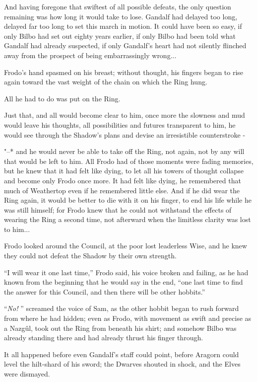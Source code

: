 And having foregone that swiftest of all possible defeats, the only
question remaining was how long it would take to lose. Gandalf had
delayed too long, delayed far too long to set this march in motion. It
could have been so easy, if only Bilbo had set out eighty years earlier,
if only Bilbo had been told what Gandalf had already suspected, if only
Gandalf's heart had not silently flinched away from the prospect of
being embarrassingly wrong...

Frodo's hand spasmed on his breast; without thought, his fingers began
to rise again toward the vast weight of the chain on which the Ring
hung.

All he had to do was put on the Ring.

Just that, and all would become clear to him, once more the slowness and
mud would leave his thoughts, all possibilities and futures transparent
to him, he would see through the Shadow's plans and devise an
irresistible counterstroke -

"--* and he would never be able to take off the Ring, not again, not by any
will that would be left to him. All Frodo had of those moments were
fading memories, but he knew that it had felt like dying, to let all his
towers of thought collapse and become only Frodo once more. It had felt
like dying, he remembered that much of Weathertop even if he remembered
little else. And if he did wear the Ring again, it would be better to
die with it on his finger, to end his life while he was still himself;
for Frodo knew that he could not withstand the effects of wearing the
Ring a second time, not afterward when the limitless clarity was lost to
him...

Frodo looked around the Council, at the poor lost leaderless Wise, and
he knew they could not defeat the Shadow by their own strength.

``I will wear it one last time,'' Frodo said, his voice broken and
failing, as he had known from the beginning that he would say in the
end, ``one last time to find the answer for this Council, and then there
will be other hobbits.''

``\emph{No!} '' screamed the voice of Sam, as the other hobbit began to
rush forward from where he had hidden; even as Frodo, with movement as
swift and precise as a Nazgûl, took out the Ring from beneath his shirt;
and somehow Bilbo was already standing there and had already thrust his
finger through.

It all happened before even Gandalf's staff could point, before Aragorn
could level the hilt-shard of his sword; the Dwarves shouted in shock,
and the Elves were dismayed.


